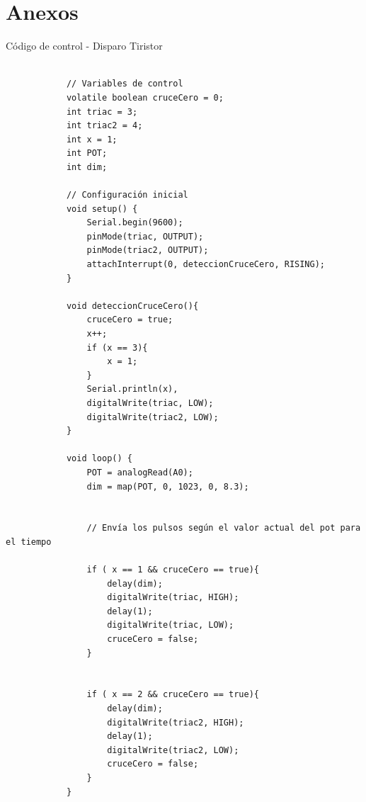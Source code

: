 \documentclass[conference]{IEEEtran}
\begin{document}
	
	
	\section{Anexos}
	
	\begin{listing}
		\caption{Código de control - Disparo Tiristor}
		\label{lst:disparo-triac}
		\begin{verbatim}
			
			// Variables de control
			volatile boolean cruceCero = 0;
			int triac = 3;
			int triac2 = 4;
			int x = 1;
			int POT;
			int dim;
			
			// Configuración inicial
			void setup() {
				Serial.begin(9600);
				pinMode(triac, OUTPUT);
				pinMode(triac2, OUTPUT);
				attachInterrupt(0, deteccionCruceCero, RISING);
			}
			
			void deteccionCruceCero(){
				cruceCero = true;
				x++;
				if (x == 3){
					x = 1;
				}
				Serial.println(x),
				digitalWrite(triac, LOW);
				digitalWrite(triac2, LOW);
			}
			
			void loop() {
				POT = analogRead(A0);
				dim = map(POT, 0, 1023, 0, 8.3);
				
				
				// Envía los pulsos según el valor actual del pot para el tiempo
				
				if ( x == 1 && cruceCero == true){
					delay(dim);
					digitalWrite(triac, HIGH);
					delay(1);
					digitalWrite(triac, LOW);
					cruceCero = false;
				}
				
				
				if ( x == 2 && cruceCero == true){
					delay(dim);
					digitalWrite(triac2, HIGH);
					delay(1);
					digitalWrite(triac2, LOW);
					cruceCero = false;
				}
			}
		\end{verbatim}
	\end{listing}
	
\end{document}
